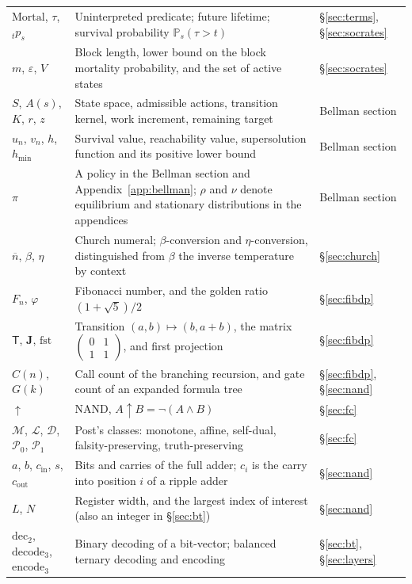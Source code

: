 \documentclass[11pt]{article}
\theoremstyle{definition}
\theoremstyle{remark}
\renewcommand{\Pr}{\mathbb{P}}
\newcommand{\cn}[1]{\overline{#1}}
\newcommand{\nand}{\uparrow}
\newcommand{\Tm}{\mathsf{T}}
\begin{document}
{\begin{longtable}{@{}p{}p{}p{}@{}}
$\mathrm{Mortal}$, $\tau$, ${}_{t}p_{s}$ & Uninterpreted predicate; future lifetime; survival probability $\Pr_s(\tau > t)$ & \S\ref{sec:terms}, \S\ref{sec:socrates} \\
$m$, $\varepsilon$, $V$ & Block length, lower bound on the block mortality probability, and the set of active states & \S\ref{sec:socrates} \\
$S$, $A(s)$, $K$, $r$, $z$ & State space, admissible actions, transition kernel, work increment, remaining target & Bellman section \\
$u_n$, $v_n$, $h$, $h_{\min}$ & Survival value, reachability value, supersolution function and its positive lower bound & Bellman section \\
$\pi$ & A policy in the Bellman section and Appendix~\ref{app:bellman}; $\rho$ and $\nu$ denote equilibrium and stationary distributions in the appendices & Bellman section \\
$\cn{n}$, $\beta$, $\eta$ & Church numeral; $\beta$-conversion and $\eta$-conversion, distinguished from $\beta$ the inverse temperature by context & \S\ref{sec:church} \\
$F_n$, $\varphi$ & Fibonacci number, and the golden ratio $(1+\sqrt5)/2$ & \S\ref{sec:fibdp} \\
$\Tm$, $\mathbf{J}$, $\mathrm{fst}$ & Transition $(a,b) \mapsto (b, a+b)$, the matrix $\begin{pmatrix}0&1\\1&1\end{pmatrix}$, and first projection & \S\ref{sec:fibdp} \\
$C(n)$, $G(k)$ & Call count of the branching recursion, and gate count of an expanded formula tree & \S\ref{sec:fibdp}, \S\ref{sec:nand} \\
$\nand$ & NAND, $A \nand B = \neg(A \land B)$ & \S\ref{sec:fc} \\
$\mathcal{M}$, $\mathcal{L}$, $\mathcal{D}$, $\mathcal{P}_0$, $\mathcal{P}_1$ & Post's classes: monotone, affine, self-dual, falsity-preserving, truth-preserving & \S\ref{sec:fc} \\
$a$, $b$, $c_{\mathrm{in}}$, $s$, $c_{\mathrm{out}}$ & Bits and carries of the full adder; $c_i$ is the carry into position $i$ of a ripple adder & \S\ref{sec:nand} \\
$L$, $N$ & Register width, and the largest index of interest (also an integer in \S\ref{sec:bt}) & \S\ref{sec:nand} \\
$\mathrm{dec}_2$, $\mathrm{decode}_3$, $\mathrm{encode}_3$ & Binary decoding of a bit-vector; balanced ternary decoding and encoding & \S\ref{sec:bt}, \S\ref{sec:layers} \\

\end{longtable}}
\end{document}
